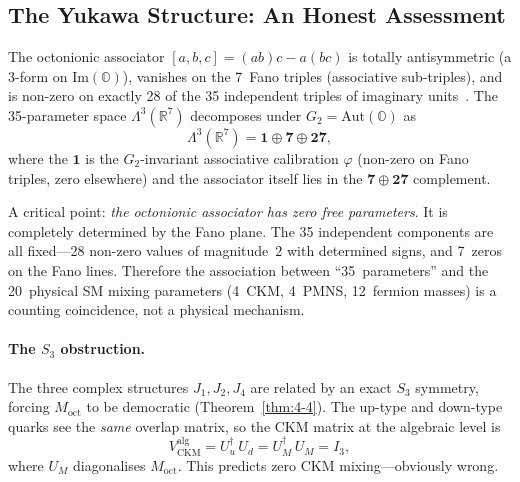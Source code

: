 \subsection{The Yukawa Structure: An Honest Assessment}
\label{sec:4-yukawa-assessment}

The octonionic associator $[a, b, c] = (ab)c - a(bc)$ is totally antisymmetric (a 3-form on $\mathrm{Im}(\mathbb{O})$), vanishes on the 7~Fano triples (associative sub-triples), and is non-zero on exactly 28 of the 35 independent triples of imaginary units~\cite{ch4:Baez2002}. The 35-parameter space $\Lambda^3(\mathbb{R}^7)$ decomposes under $G_2 = \mathrm{Aut}(\mathbb{O})$ as
\begin{equation}
  \Lambda^3(\mathbb{R}^7) = \mathbf{1} \oplus \mathbf{7} \oplus \mathbf{27},
  \label{eq:4-88}
\end{equation}
where the $\mathbf{1}$ is the $G_2$-invariant associative calibration $\varphi$ (non-zero on Fano triples, zero elsewhere) and the associator itself lies in the $\mathbf{7} \oplus \mathbf{27}$ complement.

A critical point: \emph{the octonionic associator has zero free parameters}. It is completely determined by the Fano plane. The 35 independent components are all fixed---28 non-zero values of magnitude~$2$ with determined signs, and 7~zeros on the Fano lines. Therefore the association between ``35~parameters'' and the 20~physical SM mixing parameters (4~CKM, 4~PMNS, 12~fermion masses) is a counting coincidence, not a physical mechanism.

\paragraph{The $S_3$ obstruction.}
The three complex structures $J_1, J_2, J_4$ are related by an exact $S_3$ symmetry, forcing $M_{\mathrm{oct}}$ to be democratic (Theorem~\ref{thm:4-4}). The up-type and down-type quarks see the \emph{same} overlap matrix, so the CKM matrix at the algebraic level is
\begin{equation}
  V_{\mathrm{CKM}}^{\mathrm{alg}} = U_u^\dagger\, U_d = U_M^\dagger\, U_M = I_3,
  \label{eq:4-89}
\end{equation}
where $U_M$ diagonalises $M_{\mathrm{oct}}$. This predicts zero CKM mixing---obviously wrong.

